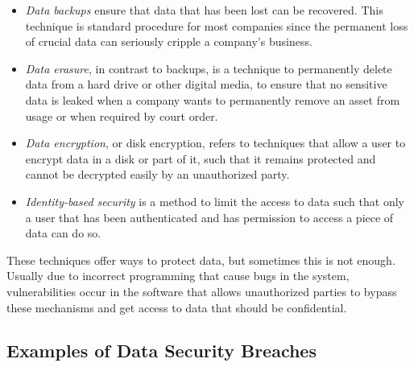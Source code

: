 \begin{itemize}

    \item \textit{Data backups} ensure that data that has been lost can be recovered. This technique is standard procedure for most companies since the permanent loss of crucial data can seriously cripple a company's business.

    \item \textit{Data erasure}, in contrast to backups, is a technique to permanently delete data from a hard drive or other digital media, to ensure that no sensitive data is leaked when a company wants to permanently remove an asset from usage or when required by court order.

    \item \textit{Data encryption}, or disk encryption, refers to techniques that allow a user to encrypt data in a disk or part of it, such that it remains protected and cannot be decrypted easily by an unauthorized party.

    \item \textit{Identity-based security} is a method to limit the access to data such that only a user that has been authenticated and has permission to access a piece of data can do so.


\end{itemize}


These techniques offer ways to protect data, but sometimes this is not enough. Usually due to incorrect programming that cause bugs in the system, vulnerabilities occur in the software that allows unauthorized parties to bypass these mechanisms and get access to data that should be confidential.



\subsection{Examples of Data Security Breaches} 
\label{ssec:ExamplesDataSecurityBreaches}


